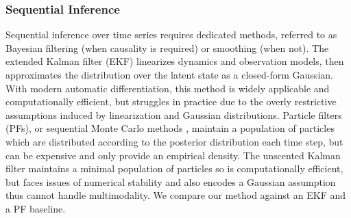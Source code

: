 \subsubsection{Sequential Inference}
Sequential inference over time series requires dedicated methods, referred to as Bayesian filtering (when causality is required) or smoothing (when not). The extended Kalman filter (EKF) linearizes dynamics and observation models, then approximates the distribution over the latent state as a closed-form Gaussian. With modern automatic differentiation, this method is widely applicable and computationally efficient, but struggles in practice due to the overly restrictive assumptions induced by linearization and Gaussian distributions. Particle filters (PFs), or sequential Monte Carlo methods \cite{SMC}, maintain a population of particles which are distributed according to the posterior distribution each time step, but can be expensive and only provide an empirical density. The unscented Kalman filter \cite{ukf} maintains a minimal population of particles so is computationally efficient, but faces issues of numerical stability and also encodes a Gaussian assumption thus cannot handle multimodality. We compare our method against an EKF and a PF baseline.